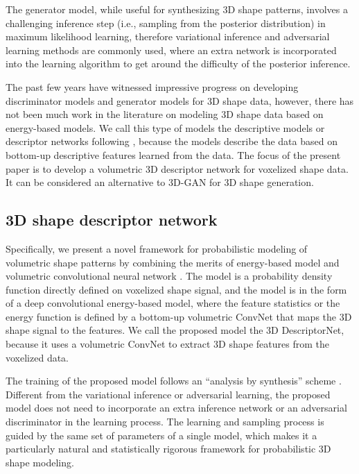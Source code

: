 \documentclass[10pt,twocolumn,letterpaper]{article}
\begin{document}
The generator model, while useful for synthesizing 3D shape patterns, involves a challenging inference step (i.e., sampling from the posterior distribution) in maximum likelihood learning, therefore variational inference \cite{kingma2013auto} and adversarial learning \cite{goodfellow2014generative, radford2015unsupervised, 3dgan} methods are commonly used, where an extra network is incorporated into the learning algorithm to get around the difficulty of the posterior inference. 

The past few years have witnessed impressive progress on developing  discriminator models and generator models for 3D shape data, however, there has not been much work in the literature on modeling 3D shape data based on energy-based models. We call this type of models the descriptive models or descriptor networks following \cite{zhu2003statistical}, because the models describe the data based on bottom-up descriptive features learned from the data. The focus of the present paper is to develop a volumetric 3D descriptor network for voxelized shape data. It can be considered an alternative to 3D-GAN \cite{3dgan} for 3D shape generation. 

\subsection{3D shape descriptor network}
Specifically, we present a novel framework for probabilistic modeling of volumetric shape patterns  by combining the merits of energy-based model \cite{Lecun2006} and volumetric convolutional neural network \cite{maturana2015voxnet}. The model is a probability density function directly defined on voxelized shape signal, and the model is in the form of a deep convolutional energy-based model, where the feature statistics or the energy function is defined by a bottom-up volumetric ConvNet that maps the 3D shape signal to the features. 
We call the proposed model the 3D DescriptorNet, because it uses a volumetric ConvNet to extract 3D shape features from the voxelized data.  

The training of the proposed model follows an ``analysis by synthesis'' scheme \cite{grenander2007pattern}. Different from the variational inference or adversarial learning, the proposed model does not need to incorporate an extra inference network or an adversarial discriminator in the learning process.  The learning and sampling process is guided by the same set of parameters of a single model, which makes it a particularly natural and statistically rigorous framework for probabilistic 3D shape modeling. 
\end{document}
